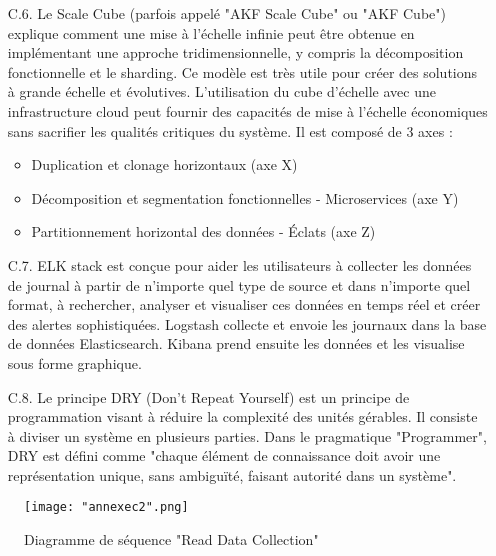 \begin{itemize}
\item[C.6.] 
    Le Scale Cube (parfois appelé "AKF Scale Cube" ou "AKF Cube") explique comment une mise à l'échelle infinie peut être obtenue en implémentant une approche tridimensionnelle, y compris la décomposition fonctionnelle et le sharding. Ce modèle est très utile pour créer des solutions à grande échelle et évolutives. L'utilisation du cube d'échelle avec une infrastructure cloud peut fournir des capacités de mise à l'échelle économiques sans sacrifier les qualités critiques du système. Il est composé de 3 axes :
    \begin{itemize}
        \item Duplication et clonage horizontaux (axe X)
        \item Décomposition et segmentation fonctionnelles - Microservices (axe Y)
        \item Partitionnement horizontal des données - Éclats (axe Z)
    \end{itemize}
\item[C.7.] ELK stack est conçue pour aider les utilisateurs à collecter les données de journal à partir de n'importe quel type de source et dans n'importe quel format, à rechercher, analyser et visualiser ces données en temps réel et créer des alertes sophistiquées. Logstash collecte et envoie les journaux dans la base de données Elasticsearch. Kibana prend ensuite les données et les visualise sous forme graphique.
\item[C.8.] Le principe DRY (Don’t Repeat Yourself) est un principe de programmation visant à réduire la complexité des unités gérables. Il consiste à diviser un système en plusieurs parties. Dans le pragmatique "Programmer", DRY est défini comme "chaque élément de connaissance doit avoir une représentation unique, sans ambiguïté, faisant autorité dans un système".

\end{itemize}

\begin{figure}[!ht]\centering
\texttt{[image: "annexec2".png]}
\caption{Diagramme de séquence "Read Data Collection"}
\label{fig:fig1}
\end{figure}
\FloatBarrier

